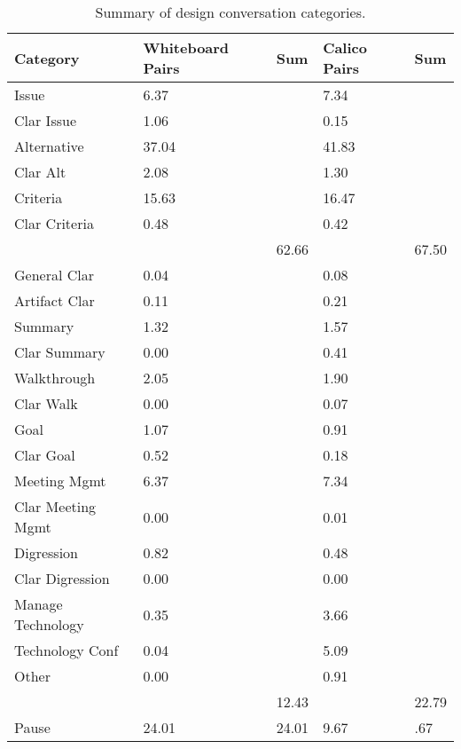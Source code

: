 \begin{table}
\centering
\caption{Summary of design conversation categories.}
\begin{tabular}{ p{3.5cm}p{1.5cm}p{1.5cm}p{1.5cm}p{1.5cm} }
\toprule
Category & Whiteboard Pairs & Sum & Calico Pairs & Sum \\
\midrule
Issue 		& 6.37		&	& 7.34 		&  \\
   Clar Issue	& 1.06		&	& 0.15 		&  \\
Alternative	& 37.04	&	& 41.83 	& \\
 Clar Alt	& 2.08		&	& 1.30 		&	\\
Criteria		& 15.63	& 	& 16.47 	&	\\
 Clar Criteria	& 0.48		&	& 0.42		& \\
		&		& 62.66 &		& 67.50 \\
General Clar	& 0.04		&	& 0.08		&	\\
Artifact Clar	& 0.11		&	& 0.21		&	\\
Summary	& 1.32		& 	& 1.57		&	\\
 Clar Summary & 0.00	&	& 0.41		&	\\
Walkthrough	& 2.05		&	& 1.90		&	\\
 Clar Walk	& 0.00		&	& 0.07		&	\\
Goal		& 1.07		&	& 0.91		&	\\
 Clar Goal	& 0.52		& 	& 0.18		&	\\
Meeting Mgmt	& 6.37		& 	& 7.34		&	\\
 Clar Meeting Mgmt & 0.00 &	& 0.01		&	 \\
Digression	& 0.82		&	& 0.48		& 	\\
 Clar Digression & 0.00	&	& 0.00		&	\\
Manage Technology & 0.35	&	& 3.66		&	\\
Technology Conf & 0.04	&	& 5.09		&	\\
Other		& 0.00		&	& 0.91		&	\\
		&		& 12.43 & 	& 22.79 \\
Pause		& 24.01	& 24.01 & 9.67 & .67 \\
\bottomrule
\end{tabular}
\label{table:2}
\end{table}	

